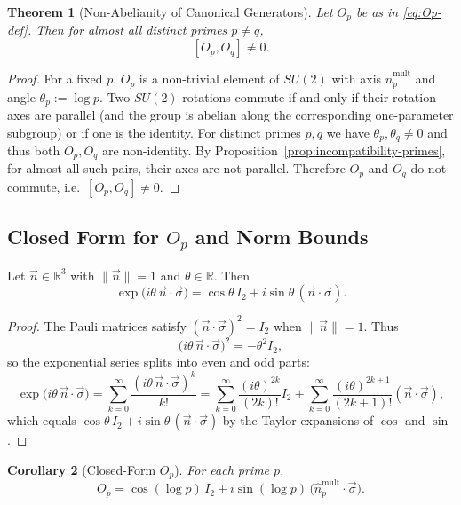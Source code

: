 \documentclass[11pt]{article}
\newtheorem{theorem}{Theorem}[section]
\newtheorem{corollary}[theorem]{Corollary}
\theoremstyle{remark}
\begin{document}
\begin{theorem}[Non-Abelianity of Canonical Generators]
Let $O_p$ be as in \eqref{eq:Op-def}. Then for almost all distinct primes
$p\neq q$,
\[
  [O_p, O_q] \neq 0.
\]
\end{theorem}

\begin{proof}
For a fixed $p$, $O_p$ is a non-trivial element of $SU(2)$ with axis
$\hat{n}_p^{\mathrm{mult}}$ and angle $\theta_p:=\log p$. Two $SU(2)$
rotations commute if and only if their rotation axes are parallel (and the
group is abelian along the corresponding one-parameter subgroup) or if one is
the identity. For distinct primes $p,q$ we have $\theta_p,\theta_q\ne0$ and
thus both $O_p,O_q$ are non-identity. By
Proposition~\ref{prop:incompatibility-primes}, for almost all such pairs,
their axes are not parallel. Therefore $O_p$ and $O_q$ do not commute, i.e.\
$[O_p,O_q]\neq 0$.
\end{proof}

\subsection{Closed Form for $O_p$ and Norm Bounds}

\begin{lemma}
Let $\vec{n}\in\mathbb{R}^3$ with $\|\vec{n}\|=1$ and $\theta\in\mathbb{R}$.
Then
\[
  \exp\bigl(i\theta\,\vec{n}\cdot\vec{\sigma}\bigr)
  = \cos\theta\,I_2 + i\sin\theta\,(\vec{n}\cdot\vec{\sigma}).
\]
\end{lemma}

\begin{proof}
The Pauli matrices satisfy $(\vec{n}\cdot\vec{\sigma})^2=I_2$ when
$\|\vec{n}\|=1$. Thus
\[
  \bigl(i\theta\,\vec{n}\cdot\vec{\sigma}\bigr)^2
  = -\theta^2 I_2,
\]
so the exponential series splits into even and odd parts:
\[
  \exp\bigl(i\theta\,\vec{n}\cdot\vec{\sigma}\bigr)
  = \sum_{k=0}^\infty \frac{(i\theta\,\vec{n}\cdot\vec{\sigma})^k}{k!}
  = \sum_{k=0}^\infty \frac{(i\theta)^{2k}}{(2k)!}I_2
    + \sum_{k=0}^\infty
      \frac{(i\theta)^{2k+1}}{(2k+1)!}(\vec{n}\cdot\vec{\sigma}),
\]
which equals $\cos\theta\,I_2 + i\sin\theta\,(\vec{n}\cdot\vec{\sigma})$ by
the Taylor expansions of $\cos$ and $\sin$.
\end{proof}

\begin{corollary}[Closed-Form $O_p$]
For each prime $p$,
\[
  O_p = \cos(\log p)\,I_2 +
  i\sin(\log p)\,\bigl(\hat{n}_p^{\mathrm{mult}}\cdot\vec{\sigma}\bigr).
\]
\end{corollary}
\end{document}
